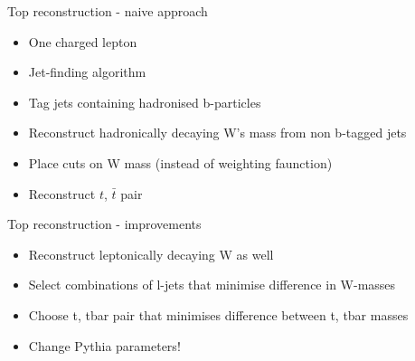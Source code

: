 \documentclass{beamer}
\begin{document}
  \begin{frame}{Top reconstruction - naive approach}
    \begin{itemize}[<uncover@+>]
      \item One charged lepton
      \item Jet-finding algorithm
      \item Tag jets containing hadronised b-particles 
      \item Reconstruct hadronically decaying W's mass from non b-tagged jets
      \item Place cuts on W mass (instead of weighting faunction)
      \item Reconstruct $t$, $\bar{t}$ pair
    \end{itemize}
  \end{frame}

  \begin{frame}{Top reconstruction - improvements}
    \begin{itemize}[<uncover@+>]
      \item Reconstruct leptonically decaying W as well
      \item Select combinations of l-jets that minimise difference in W-masses
      \item Choose t, tbar pair that minimises difference between t, tbar masses
      \item Change Pythia parameters!
    \end{itemize}
  \end{frame}
\end{document}

